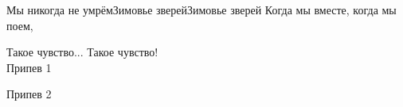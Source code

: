 \documentclass[11pt,a5paper]{book}
\begin{document}
\begin{song}{Мы никогда не умрём}{}{Зимовье зверей}{Зимовье зверей}{}{}
Когда мы вместе, когда мы поем,\par
Такое чувство... Такое чувство!\\

Припев 1\par
Припев 2\\
\begin{SBSection*}
\begin{figure}[b!]
\end{figure}
\end{SBSection*}
\end{song}
\end{document}
